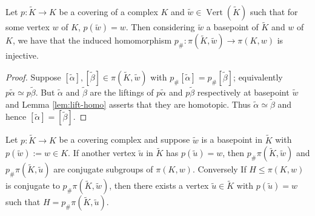 \begin{theorem}
  \label{thm:injection}
  Let $p:\tilde{K} \rightarrow K$ be a covering of a complex $K$ and $\tilde{w} \in \operatorname{Vert}(\tilde{K})$ such that for some vertex $w$ of $K$, $p(\tilde{w}) = w$. Then considering $\tilde{w}$ a basepoint of $\tilde{K}$ and $w$ of $K$, we have that the induced homomorphism $p_{\#} : \pi(\tilde{K},\tilde{w}) \rightarrow \pi(K,w)$ is injective.
\end{theorem}

\begin{proof}
  Suppose $[\tilde{\alpha}],[\tilde{\beta}] \in \pi(\tilde{K},\tilde{w})$ with $p_{\#}[\tilde{\alpha}] = p_{\#}[\tilde{\beta}]$; equivalently $p\tilde{\alpha} \simeq p\tilde{\beta}$. But $\tilde{\alpha}$ and $\tilde{\beta}$ are the liftings of $p\tilde{\alpha}$ and $p\tilde{\beta}$ respectively at basepoint $\tilde{w}$ and Lemma \ref{lem:lift-homo} asserts that they are homotopic. Thus $\tilde{\alpha} \simeq \tilde{\beta}$ and hence $[\tilde{\alpha}] = [\tilde{\beta}]$.
\end{proof}

\begin{theorem}
  \label{thm:conj}
  Let $p: \tilde{K} \rightarrow K$ be a covering complex and suppose $\tilde{w}$ is a basepoint in $\tilde{K}$ with $p(\tilde{w}) := w \in K$. If another vertex $\tilde{u}$ in $\tilde{K}$ has $p(\tilde{u}) = w$, then $p_{\#}\pi(\tilde{K},\tilde{w})$ and $p_{\#}\pi(\tilde{K},\tilde{u})$ are conjugate subgroups of $\pi(K,w)$. Conversely If $H \leq \pi(K,w)$ is conjugate to $p_{\#}\pi(\tilde{K},\tilde{w})$, then there exists a vertex $\tilde{u} \in \tilde{K}$ with $p(\tilde{u}) = w$ such that $H = p_{\#}\pi(\tilde{K},\tilde{u})$.
\end{theorem}

